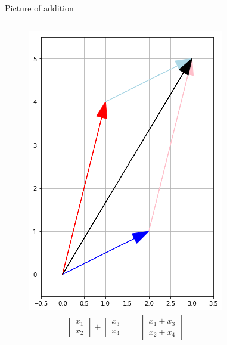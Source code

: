 \documentclass{beamer}
\begin{document}
\begin{frame}{Picture of addition}
  \begin{figure}
    \begin{columns}
      \includegraphics[scale=0.4]{tiptotail.png}
      \hspace{-2cm}
      \begin{align*}
        \left[
	\begin{array}{c}
          x_1\\
          x_2
	\end{array}
        \right]+\left[
	\begin{array}{c}
          x_3\\
          x_4
	\end{array}
        \right]=
        \left[
	\begin{array}{c}
          x_1+x_3\\
          x_2+x_4
	\end{array}
        \right]
      \end{align*}
    \end{columns}
  \end{figure}
\end{frame}
\end{document}
